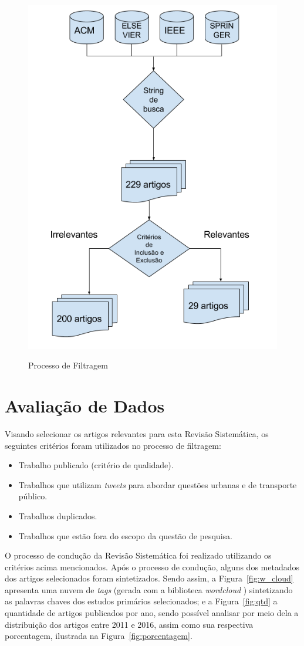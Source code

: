 \documentclass[
	12pt,				%
	oneside,			%
	a4paper,			%
	english,			%
	brazil				%
	]{abntex2ppgsi}
\begin{document}
{{\begin{figure}[H]%
	\centering
 	  \caption{Processo de Filtragem}
		\includegraphics[width=0.5\linewidth]{images/metodologia_metodologia.png}
	\label{fig:filter}
\end{figure}

\section{Avaliação de Dados}
\label{avaliacao}

Visando selecionar os artigos relevantes para esta Revisão Sistemática, os seguintes critérios foram utilizados no processo de filtragem:

\begin{itemize}
\item Trabalho publicado (critério de qualidade).
\item Trabalhos que utilizam \textit{tweets} para abordar questões urbanas e de transporte público.
\item Trabalhos duplicados.
\item Trabalhos que estão fora do escopo da questão de pesquisa.
\end{itemize}

O processo de condução da Revisão Sistemática foi realizado utilizando os critérios acima mencionados. Após o processo de condução, alguns dos metadados dos artigos selecionados foram sintetizados. Sendo assim, a Figura~\ref{fig:w_cloud} apresenta uma nuvem de \textit{tags} (gerada com a biblioteca \textit{wordcloud} \cite{wordcloud}) sintetizando as palavras chaves dos estudos primários selecionados; e a Figura~\ref{fig:qtd} a quantidade de artigos publicados por ano, sendo possível analisar por meio dela a distribuição dos artigos entre 2011 e 2016, assim como sua respectiva porcentagem, ilustrada na Figura~\ref{fig:porcentagem}.

}}
\end{document}
